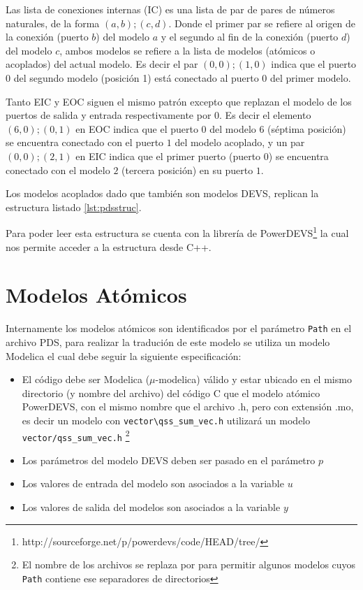         Las lista de conexiones internas (IC) es una lista de par de pares de números naturales, de la forma $(a,b);(c,d)$.
        Donde el primer par se refiere al origen de la conexión (puerto $b$) del modelo $a$ y el segundo al fin de la conexión (puerto $d$) 
        del modelo $c$, ambos modelos se refiere a la lista de modelos (atómicos o acoplados) del actual modelo.
        Es decir el par $(0,0);(1,0)$ indica que el puerto $0$ del segundo modelo (posición 1) está conectado al puerto $0$ del primer modelo.

        Tanto EIC y EOC siguen el mismo patrón excepto que replazan el modelo de los puertos de salida y entrada respectivamente por $0$. Es decir el elemento 
        $(6,0);(0,1)$ en EOC indica que el puerto $0$ del modelo $6$ (séptima posición)  se encuentra conectado con el puerto $1$ del modelo 
        acoplado, y un par $(0,0);(2,1)$ en EIC indica que el primer puerto (puerto $0$) se encuentra conectado con el modelo $2$ (tercera posición) en su puerto $1$.

        Los modelos acoplados dado que también son modelos DEVS, replican la estructura listado \ref{lst:pdsstruc}.

        Para poder leer esta estructura se cuenta con la librería de PowerDEVS\footnote{http://sourceforge.net/p/powerdevs/code/HEAD/tree/} la cual nos permite acceder
        a la estructura desde C++. 

\section{Modelos Atómicos}
        

        Internamente los modelos atómicos son identificados por el parámetro \texttt{Path} en el archivo PDS, para realizar la tradución de este modelo se utiliza 
        un modelo Modelica el cual debe seguir la siguiente especificación:

\begin{itemize}
        \item El código debe ser Modelica ($\mu$-modelica) válido y estar ubicado en el mismo directorio (y nombre del archivo) del código C que el modelo atómico 
        PowerDEVS, con el mismo nombre que el archivo .h, pero con extensión .mo, es decir un modelo con \texttt{vector\textbackslash qss\_sum\_vec.h} 
	utilizará un modelo \texttt{vector/qss\_sum\_vec.h} \footnote{El nombre de los archivos se replaza \quotes{\textbackslash} por \quotes{/} para permitir 
	algunos modelos cuyos \texttt{Path} contiene ese separadores de directorios}
        \item Los parámetros del modelo DEVS deben ser pasado en el parámetro $p$
        \item Los valores de entrada del modelo son asociados a la variable $u$
        \item Los valores de salida del modelos son asociados a la variable $y$
\end{itemize}


